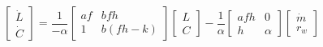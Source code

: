 \renewcommand{\arraystretch}{1.3}
\setlength{\arraycolsep}{.05in}
\[
\left[
\begin{array}{c}
\dot{L} \\
\dot{C}
\end{array}
\right]
= \frac{1}{-\alpha}
\left[
\begin{array}{cc}
af & bfh \\
1 & b(fh-k)
\end{array}
\right]
\left[
\begin{array}{c}
L \\
C 
\end{array}
\right]
-\frac{1}{\alpha}
\left[
\begin{array}{cc}
afh & 0 \\
h & \alpha 
\end{array}
\right]
\left[
\begin{array}{c}
\dot{m} \\
r_w
\end{array}
\right]
\]
